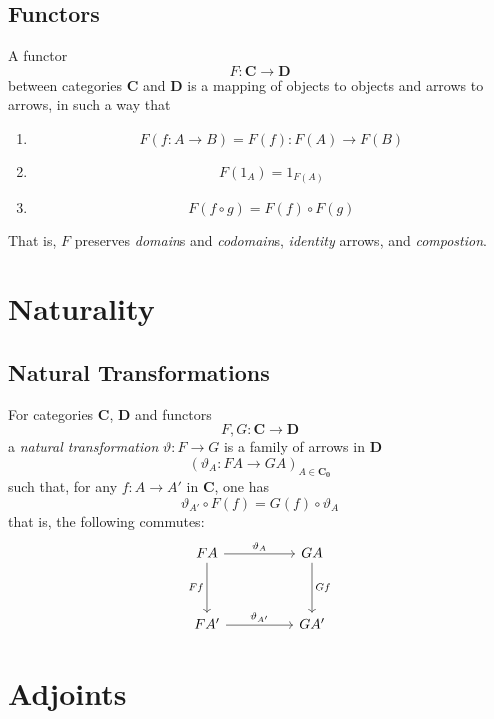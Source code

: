 \documentclass{article}
\begin{document}
\subsection{Functors}
\begin{defn}[{\cite{AS10}}]
A functor
\[
F: \mathbf{C} \rightarrow \mathbf{D}
\]
between categories $\mathbf{C}$ and $\mathbf{D}$ is a mapping of objects to objects and arrows to arrows,
in such a way that
\begin{enumerate}
\item
\[
F(f:A \rightarrow B) = F(f):F(A) \rightarrow F(B)
\]
\item
\[
F(1_{A}) = 1_{F(A)}
\]
\item
\[
F(f \circ g) = F(f) \circ F(g)
\]
\end{enumerate}
That is, $F$ preserves \emph{domain}s and \emph{codomain}s, \emph{identity} arrows, and \emph{compostion}.
\end{defn}

\section{Naturality}
\subsection{Natural Transformations}
\begin{defn}[{\cite{AS10}}]
For categories $\mathbf{C}$, $\mathbf{D}$ and functors
\[
F,G: \mathbf{C} \rightarrow \mathbf{D}
\]
a \emph{natural transformation} $\vartheta: F \rightarrow G$ is a family of arrows in $\mathbf{D}$
\[
(\vartheta_{A}: FA \rightarrow GA)_{A \in \mathbf{C_0}}
\]
such that, for any $f: A \rightarrow A'$ in $\mathbf{C}$, one has
\[
\vartheta_{A'} \circ F(f) = G(f) \circ \vartheta_{A}
\]
that is, the following commutes:
\[
\begin{tikzcd}[row sep=huge, column sep=huge]
FA \arrow[r, "\vartheta_{A}"] \arrow[d, "Ff"'] & GA \arrow[d, "Gf"] \\
FA' \arrow[r, "\vartheta_{A'}"]                & GA'
\end{tikzcd}
\]
\end{defn}

\section{Adjoints}
\end{document}
